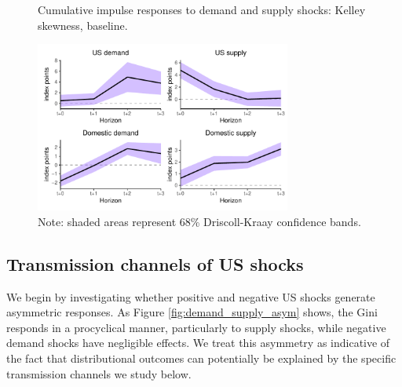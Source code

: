 \documentclass[12pt, a4paper]{article}
\begin{document}
\begin{figure}[H]
    \centering    
    \caption{Cumulative impulse responses to demand and supply shocks: Kelley skewness, baseline.}  
    \label{fig:kelley_base}
    \includegraphics[width=0.75\textwidth]{Figures/kelley_demand_supply_LP.pdf}
    \centering \caption*{Note: shaded areas represent 68\% Driscoll-Kraay confidence bands.}
\end{figure}



\subsection{Transmission channels of US shocks}
We begin by investigating whether positive and negative US shocks generate asymmetric responses. As Figure \ref{fig:demand_supply_asym} shows, the Gini responds in a procyclical manner, particularly to supply shocks, while negative demand shocks have negligible effects. We treat this asymmetry as indicative of the fact that distributional outcomes can potentially be explained by the specific transmission channels we study below.
\end{document}
